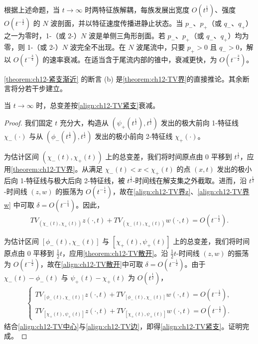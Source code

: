 \documentclass[../../main.tex]{subfiles}
\begin{document}
根据上述命题，当 $t\to\infty$ 时两特征族解耦，每族发展出宽度 $O(t^{\frac12})$、强度 $O(t^{-\frac12})$ 的 $N$ 波剖面，并以特征速度传播进静止状态。当 $p_-$、$p_+$（或 $q_-$、$q_+$）之一为零时，1-（或 2-）$N$ 波是单侧三角形剖面。若 $p_-$、$p_+$（或 $q_-$、$q_+$）均为零，则 1-（或 2-）$N$ 波完全不出现。在 $N$ 波尾流中，只要 $p_+>0$ 且 $q_->0$，解以 $O(t^{-\frac34})$ 的速率衰减。在适当含于尾流内部的锥中，衰减更快，为 $O(t^{-\frac32})$。

\cref{theorem:ch12-紧支渐近} 的断言 (b) 是\cref{theorem:ch12-TV界}的直接推论。其余断言将分若干步建立。

\begin{lemma}\label{lemma:ch12-TV衰减紧支}
当 $t\to\infty$ 时，总变差按\eqref{align:ch12-TV紧支}衰减。
\end{lemma}

\begin{proof}
我们固定 $t$ 充分大，构造从 $(\psi_+(t^{\frac12}),t^{\frac12})$ 发出的极大前向 1-特征线 $\chi_-(\cdot)$ 与从 $(\phi_-(t^{\frac12}),t^{\frac12})$ 发出的极小前向 2-特征线 $\chi_+(\cdot)$。

为估计区间 $(\chi_-(t),\chi_+(t))$ 上的总变差，我们将时间原点由 $0$ 平移到 $t^{\frac12}$，应用\cref{theorem:ch12-TV界}。从满足 $\chi_-(t)<x<\chi_+(t)$ 的点 $(x,t)$ 发出的极小后向 1-特征线与极大后向 2-特征线，被 $t^{\frac12}$-时间线在解支集之外截取。进而，沿 $t^{\frac12}$-时间线 $(z,w)$ 的振荡为 $O(t^{-\frac14})$，故在\eqref{align:ch12-TV界z}、\eqref{align:ch12-TV界w} 中可取 $\delta=O(t^{-\frac14})$。因此，
\begin{align}
TV_{(\chi_-(t),\chi_+(t))}z(\cdot,t)+TV_{(\chi_-(t),\chi_+(t))}w(\cdot,t)=O(t^{-\frac12}).
\label{align:ch12-TV中心}
\end{align}

为估计区间 $[\phi_-(t),\chi_-(t)]$ 与 $[\chi_+(t),\psi_+(t)]$ 上的总变差，我们将时间原点由 $0$ 平移到 $\frac12t$，应用\cref{theorem:ch12-TV散开}。沿 $\frac12t$-时间线 $(z,w)$ 的振荡为 $O(t^{-\frac12})$，故在\eqref{align:ch12-TV散开}中可取 $\delta=O(t^{-\frac12})$。由于 $\chi_-(t)-\phi_-(t)$ 与 $\psi_+(t)-\chi_+(t)$ 为 $O(t^{\frac12})$，
\begin{align}
\begin{cases}
TV_{[\phi_-(t),\chi_-(t)]}z(\cdot,t)+TV_{[\phi_-(t),\chi_-(t)]}w(\cdot,t)=O(t^{-\frac12}),\\
TV_{[\chi_+(t),\psi_+(t)]}z(\cdot,t)+TV_{[\chi_+(t),\psi_+(t)]}w(\cdot,t)=O(t^{-\frac12}).
\end{cases}
\label{align:ch12-TV边}
\end{align}
结合\eqref{align:ch12-TV中心}与\eqref{align:ch12-TV边}，即得\eqref{align:ch12-TV紧支}。证明完成。
\end{proof}
\end{document}
